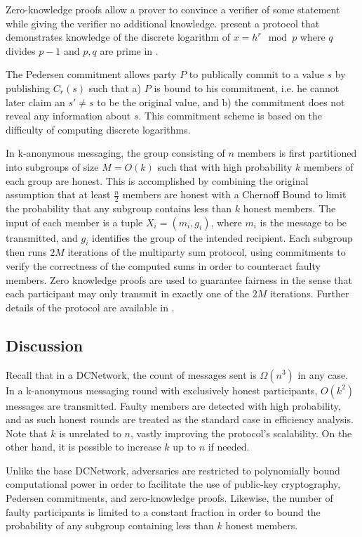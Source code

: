 Zero-knowledge proofs allow a prover to convince a verifier of some statement while
giving the verifier no additional knowledge. \citeauthor{chaum1987demonstrating}
present a protocol that demonstrates knowledge of the discrete logarithm of $x = h^r \mod p$
where $q$ divides $p - 1$ and $p,q$ are prime in \cite{chaum1987demonstrating}.

The Pedersen commitment \cite{pedersen1992non} allows party $P$ to publically commit
to a value $s$ by publishing $C_r(s)$ such that a) $P$ is bound to his commitment, i.e. he cannot later
claim an $s' \neq s$ to be the original value, and b) the commitment does not reveal
any information about $s$. This commitment scheme is based on the difficulty of computing discrete
logarithms.

In k-anonymous messaging, the group consisting of $n$ members is first partitioned
into subgroups of size $M = O(k)$ such that with high probability $k$ members of each group
are honest. This is accomplished by combining the original assumption that at least
$\frac{n}{2}$ members are honest with a Chernoff Bound to limit the probability that
any subgroup contains less than $k$ honest members. The input of each member is
a tuple $X_i = (m_i, g_i)$, where $m_i$ is the message to be transmitted, and
$g_i$ identifies the group of the intended recipient. Each subgroup then runs
$2M$ iterations of the multiparty sum protocol, using commitments to verify the
correctness of the computed sums in order to counteract faulty members. Zero knowledge
proofs are used to guarantee fairness in the sense that each participant may only transmit
in exactly one of the $2M$ iterations. Further details of the protocol are available in
\cite{von2003k}.

\subsection{Discussion}

Recall that in a \ac{DCNetwork}, the count of messages sent is $\Omega(n^3)$ in any case.
In a k-anonymous messaging round with exclusively honest participants, $O(k^2)$ messages are transmitted.
Faulty members are detected with high probability, and as such
honest rounds are treated as the standard case in efficiency analysis.
Note that $k$ is unrelated to $n$, vastly improving the protocol's scalability.
On the other hand, it is possible to increase $k$ up to $n$ if needed.

Unlike the base \ac{DCNetwork}, adversaries are restricted to polynomially bound computational
power in order to facilitate the use of public-key cryptography, Pedersen commitments, and zero-knowledge
proofs. Likewise, the number of faulty participants is limited to a constant fraction in order
to bound the probability of any subgroup containing less than $k$ honest members.

